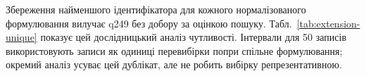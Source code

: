 \ifpaperextensionunique
Збереження найменшого ідентифікатора для кожного нормалізованого формулювання вилучає q249 без добору за оцінкою пошуку. Табл.~\ref{tab:extension-unique} показує цей дослідницький аналіз чутливості. Інтервали для 50 записів використовують записи як одиниці перевибірки попри спільне формулювання; окремий аналіз усуває цей дублікат, але не робить вибірку репрезентативною.
\begin{table}[p]
\centering
\caption{П'ять основних систем на підмножині унікальних формулювань розширення. Початкові мітки й бутстреп-інтервали за запитами; інші системи та парні статистики збережено в JSON результатів.}
\label{tab:extension-unique}

\end{table}
\fi

\else
{}
\fi
